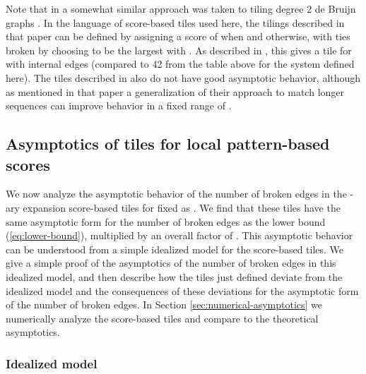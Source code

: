 \documentclass[12pt]{article}
\begin{document}
Note that in \cite{Viterbi} a somewhat similar approach was taken to
tiling degree 2 de Bruijn graphs .  In the language of
score-based tiles used here, the tilings described in that paper can
be defined by assigning a score of  when  and  otherwise, with ties broken by choosing  to be
the largest  with .  As described in \cite{Viterbi},
this gives a tile for  with  internal edges (compared
to 42 from the table above for the system defined here).  The tiles
described in \cite{Viterbi} also do not have good asymptotic behavior,
although as mentioned in that paper a generalization of their approach
to match longer sequences can improve behavior in a fixed range of .

\subsection{Asymptotics of  tiles for local pattern-based scores}

We now analyze the asymptotic behavior of the number of broken edges
in the -ary expansion score-based tiles for fixed  as .  We find that these tiles have the same
asymptotic form for the number of broken edges as the lower bound
(\ref{eq:lower-bound}), multiplied by an overall factor of .
This asymptotic behavior can be understood from a simple idealized
model for the score-based tiles.
We give a simple proof of the asymptotics of the number of broken
edges in this idealized model, and then describe how the tiles just
defined deviate from the idealized model and the consequences of
these deviations for the asymptotic form of the number of broken
edges.  In Section \ref{sec:numerical-asymptotics} we numerically
analyze the score-based tiles and compare to the theoretical asymptotics.

\subsubsection{Idealized model}
\end{document}
